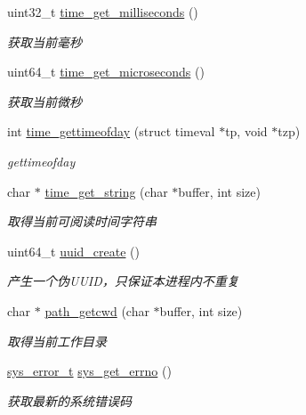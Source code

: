 \begin{DoxyCompactItemize}
uint32\+\_\+t \hyperlink{a00073_a528d27a7218cb2fdabf81ca343e24fc9_a528d27a7218cb2fdabf81ca343e24fc9}{time\+\_\+get\+\_\+milliseconds} ()
\begin{DoxyCompactList}\small\item\em 获取当前毫秒 \end{DoxyCompactList}\item 
uint64\+\_\+t \hyperlink{a00073_a5eb6de730bc28be3fbc402b9841c1819_a5eb6de730bc28be3fbc402b9841c1819}{time\+\_\+get\+\_\+microseconds} ()
\begin{DoxyCompactList}\small\item\em 获取当前微秒 \end{DoxyCompactList}\item 
int \hyperlink{a00073_a3cab12b4908938ca999206a67c8ee032_a3cab12b4908938ca999206a67c8ee032}{time\+\_\+gettimeofday} (struct timeval $\ast$tp, void $\ast$tzp)
\begin{DoxyCompactList}\small\item\em gettimeofday \end{DoxyCompactList}\item 
char $\ast$ \hyperlink{a00073_a6d3f7fda67a3c61f767f7b2dbfcbe4ee_a6d3f7fda67a3c61f767f7b2dbfcbe4ee}{time\+\_\+get\+\_\+string} (char $\ast$buffer, int size)
\begin{DoxyCompactList}\small\item\em 取得当前可阅读时间字符串 \end{DoxyCompactList}\item 
uint64\+\_\+t \hyperlink{a00073_a2b1df51bc127460a3bf25949068bfe92_a2b1df51bc127460a3bf25949068bfe92}{uuid\+\_\+create} ()
\begin{DoxyCompactList}\small\item\em 产生一个伪\+U\+U\+I\+D，只保证本进程内不重复 \end{DoxyCompactList}\item 
char $\ast$ \hyperlink{a00073_a6c98a04f00772c05a1f51afc185f7513_a6c98a04f00772c05a1f51afc185f7513}{path\+\_\+getcwd} (char $\ast$buffer, int size)
\begin{DoxyCompactList}\small\item\em 取得当前工作目录 \end{DoxyCompactList}\item 
\hyperlink{a00047_aeaea39e7ef5adeec1efaee3eee6b12ff_aeaea39e7ef5adeec1efaee3eee6b12ff}{sys\+\_\+error\+\_\+t} \hyperlink{a00073_a2e3ede072c59452900afcb1334611dac_a2e3ede072c59452900afcb1334611dac}{sys\+\_\+get\+\_\+errno} ()
\begin{DoxyCompactList}\small\item\em 获取最新的系统错误码 \end{DoxyCompactList}\item 

\end{DoxyCompactItemize}
